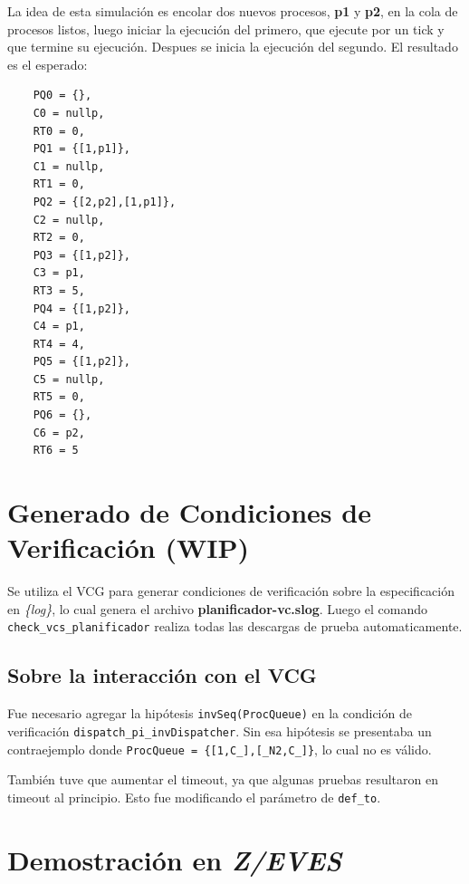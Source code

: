 \documentclass{article}
\begin{document}
La idea de esta simulación es encolar dos nuevos procesos, \textbf{p1} y \textbf{p2}, en la cola de procesos listos, luego iniciar la ejecución del primero, que ejecute por un tick y que termine su ejecución. Despues se inicia la ejecución del segundo. El resultado es el esperado:

\begin{verbatim}
    PQ0 = {},  
    C0 = nullp,  
    RT0 = 0,  
    PQ1 = {[1,p1]},  
    C1 = nullp,  
    RT1 = 0,  
    PQ2 = {[2,p2],[1,p1]},  
    C2 = nullp,  
    RT2 = 0,  
    PQ3 = {[1,p2]},  
    C3 = p1,  
    RT3 = 5,  
    PQ4 = {[1,p2]},  
    C4 = p1,  
    RT4 = 4,  
    PQ5 = {[1,p2]},  
    C5 = nullp,  
    RT5 = 0,  
    PQ6 = {},  
    C6 = p2,  
    RT6 = 5
\end{verbatim}


\section{Generado de Condiciones de Verificación (WIP)}

Se utiliza el VCG para generar condiciones de verificación sobre la especificación en \textit{\{log\}}, lo cual genera el archivo \textbf{planificador-vc.slog}. Luego el comando \verb|check_vcs_planificador| realiza todas las descargas de prueba automaticamente.

\subsection*{Sobre la interacción con el VCG}

Fue necesario agregar la hipótesis \verb|invSeq(ProcQueue)| en la condición de verificación \verb|dispatch_pi_invDispatcher|. Sin esa hipótesis se presentaba un contraejemplo donde \verb|ProcQueue = {[1,C_],[_N2,C_]}|, lo cual no es válido.





También tuve que aumentar el timeout, ya que algunas pruebas resultaron en timeout al principio. Esto fue modificando el parámetro de \verb|def_to|.

\section{Demostración en \textit{Z/EVES}}
\end{document}
